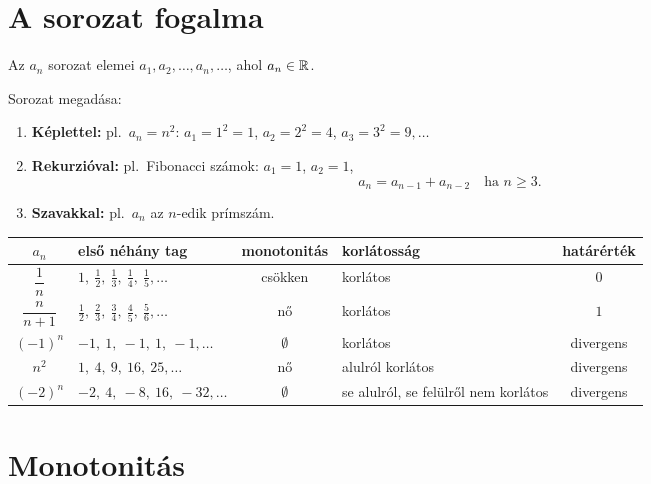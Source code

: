 \documentclass[11pt]{article}
\begin{document}

\section{A sorozat fogalma}

Az $a_{n}$ sorozat elemei $a_{1}, a_{2}, \dots, a_{n}, \dots$, ahol $a_{n}\in\mathbb{R}$.

\noindent Sorozat megadása:
\begin{enumerate}[label=\arabic*., itemsep=3pt]
\item \textbf{Képlettel:} pl.\ $a_{n}=n^{2}$: $a_{1}=1^{2}=1$, $a_{2}=2^{2}=4$, $a_{3}=3^{2}=9,\dots$
\item \textbf{Rekurzióval:} pl.\ Fibonacci számok: $a_{1}=1$, $a_{2}=1$,
\[
a_{n}=a_{n-1}+a_{n-2}\quad\text{ha } n\ge 3 .
\]
\item \textbf{Szavakkal:} pl.\ $a_{n}$ az $n$-edik prímszám.
\end{enumerate}

\begin{center}
\renewcommand{\arraystretch}{1.6}
\begin{tabular}{@{}clcp{2.6cm}c@{}}
\hline
$a_{n}$ & első néhány tag & monotonitás & korlátosság & határérték\\
\hline
$\dfrac{1}{n}$
  & $1,\ \frac{1}{2},\ \frac{1}{3},\ \frac{1}{4},\ \frac{1}{5},\dots$
  & csökken & korlátos & $0$\\
$\dfrac{n}{n+1}$
  & $\frac{1}{2},\ \frac{2}{3},\ \frac{3}{4},\ \frac{4}{5},\ \frac{5}{6},\dots$
  & nő & korlátos & $1$\\
$(-1)^{n}$
  & $-1,\ 1,\ -1,\ 1,\ -1,\dots$
  & $\emptyset$ & korlátos & divergens\\
$n^{2}$
  & $1,\ 4,\ 9,\ 16,\ 25,\dots$
  & nő & alulról korlátos & divergens\\
$(-2)^{n}$
  & $-2,\ 4,\ -8,\ 16,\ -32,\dots$
  & $\emptyset$ & {\raggedright se alulról, se felülről nem korlátos\par} & divergens\\
\hline
\end{tabular}
\end{center}

\section{Monotonitás}
\end{document}
